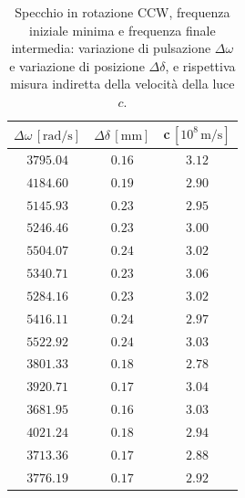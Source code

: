 \documentclass[]{article}
\begin{document}
    \begin{table}
        \centering
        \begin{tabular}{||c|c|c||}
            \hline
            $\Delta\omega\, [\text{rad/s}] $ & $\Delta\delta\, [\text{mm}] $ & $ $c$\, [10^8 \,\text{m/s}] $ \\
            \hline\hline
            $3795.04$ & $0.16 $ & $3.12$ \\\hline
            $4184.60$ & $0.19 $ & $2.90$ \\\hline
            $5145.93$ & $0.23 $ & $2.95$ \\\hline
            $5246.46$ & $0.23 $ & $3.00$ \\\hline
            $5504.07$ & $0.24 $ & $3.02$ \\\hline
            $5340.71$ & $0.23 $ & $3.06$ \\\hline
            $5284.16$ & $0.23 $ & $3.02$ \\\hline
            $5416.11$ & $0.24 $ & $2.97$ \\\hline
            $5522.92$ & $0.24 $ & $3.03$ \\\hline
            $3801.33$ & $0.18 $ & $2.78$ \\\hline
            $3920.71$ & $0.17 $ & $3.04$ \\\hline
            $3681.95$ & $0.16 $ & $3.03$ \\\hline
            $4021.24$ & $0.18 $ & $2.94$ \\\hline
            $3713.36$ & $0.17 $ & $2.88$ \\\hline
            $3776.19$ & $0.17 $ & $2.92$ \\\hline
        \end{tabular}
        \caption{Specchio in rotazione CCW, frequenza iniziale minima e frequenza finale intermedia: variazione di pulsazione $\Delta\omega$ e variazione di posizione $\Delta\delta$, e rispettiva misura indiretta della velocità della luce $c$.}
        \label{CCW_min_mid-c}
    \end{table}
\end{document}
